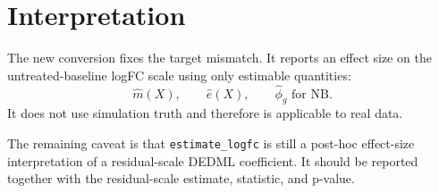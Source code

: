 \documentclass[11pt]{article}
\begin{document}
\section*{Interpretation}

The new conversion fixes the target mismatch. It reports an effect size on the
untreated-baseline logFC scale using only estimable quantities:
\[
  \widehat m(X),
  \qquad
  \widehat e(X),
  \qquad
  \widehat\phi_g \text{ for NB}.
\]
It does not use simulation truth and therefore is applicable to real data.

The remaining caveat is that \texttt{estimate\_logfc} is still a post-hoc
effect-size interpretation of a residual-scale DEDML coefficient. It should be
reported together with the residual-scale estimate, statistic, and p-value.
\end{document}
